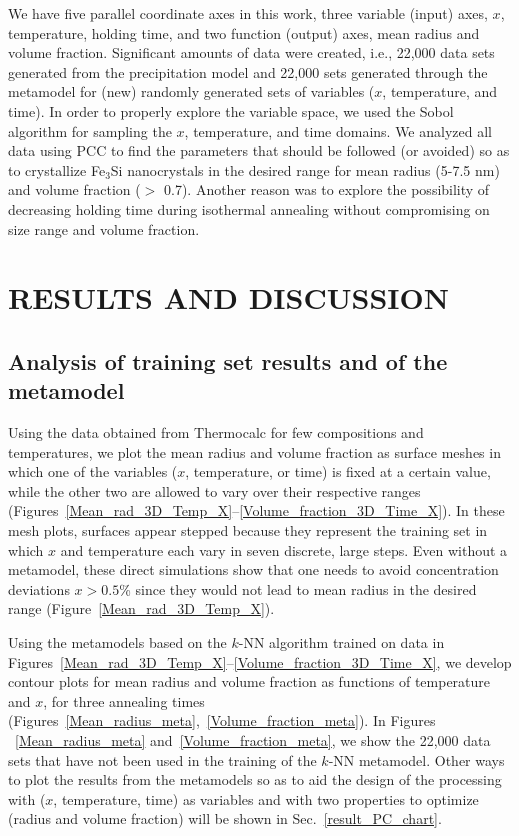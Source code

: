 We have five parallel coordinate axes in this work, three variable (input) axes, $x$, temperature, holding time, and two function (output) axes, mean radius
and volume fraction. Significant amounts of data were created, i.e.,  22,000 data sets generated from the precipitation model and 22,000 sets generated through
the metamodel for (new) randomly generated sets of variables ($x$, temperature, and time).\cite{CITRINE}
In order to properly explore the variable space, we used the Sobol algorithm\cite{SOBOL196786} for sampling the $x$, temperature, and time domains.
We analyzed all data using PCC to find the parameters that should be followed (or avoided) so as to crystallize Fe$_3$Si
nanocrystals in the desired  range for mean radius (5-7.5 nm) and volume fraction ($>$ 0.7). Another reason was to explore the possibility of decreasing holding time during isothermal annealing
without compromising on size range and volume fraction.




\section{RESULTS AND DISCUSSION}\label{results_comparison}

\subsection{Analysis of training set results and of the metamodel}

Using the data obtained from Thermocalc for few compositions and temperatures, we plot the mean radius and volume fraction as
surface meshes in which one of the variables ($x$, temperature, or time) is fixed at a certain value, while the other two are allowed to vary over their respective ranges (Figures~\ref{Mean_rad_3D_Temp_X}--\ref{Volume_fraction_3D_Time_X}).
In these mesh plots, surfaces appear stepped because they represent the training set in which $x$ and temperature each vary in seven discrete, large steps.
Even without a metamodel, these direct simulations show that one needs to avoid concentration deviations $x>0.5$\% since they would not lead to
mean radius in the desired range (Figure~\ref{Mean_rad_3D_Temp_X}).



Using the metamodels based on the $k$-NN algorithm trained on data in Figures~\ref{Mean_rad_3D_Temp_X}--\ref{Volume_fraction_3D_Time_X},
we develop contour plots for mean radius and volume fraction as functions of temperature and $x$, for three annealing times (Figures~\ref{Mean_radius_meta},~\ref{Volume_fraction_meta}).
In Figures ~\ref{Mean_radius_meta} and~\ref{Volume_fraction_meta}, we show the 22,000 data sets that have not been used in the training of the $k$-NN metamodel.
Other ways to plot the results from the metamodels so as to aid the design of the processing with ($x$, temperature, time) as variables and with two properties to
optimize (radius and volume fraction) will be shown in Sec.~\ref{result_PC_chart}.

